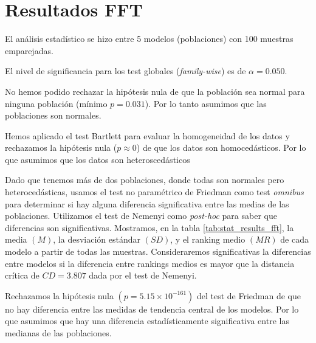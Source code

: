\documentclass[a4paper,oneside,11pt,leqno]{article}
\begin{document}
	\section{Resultados FFT}
	\label{sec:results_fft}

	El análisis estadístico se hizo entre 5 modelos (poblaciones) con 100 muestras emparejadas.

	El nivel de significancia para los test globales (\textit{family-wise}) es de $\alpha=0.050$.

	No hemos podido rechazar la hipótesis nula de que la población sea normal para ninguna población (mínimo $p=0.031$). Por lo tanto asumimos que las poblaciones son normales.

	Hemos aplicado el test Bartlett para evaluar la homogeneidad de los datos y rechazamos la hipótesis nula ($p\approx 0$) de que los datos son homocedásticos. Por lo que asumimos que los datos son heteroscedásticos

	Dado que tenemos más de dos poblaciones, donde todas son normales pero heterocedásticas, usamos el test no paramétrico de Friedman como test \textit{omnibus} para determinar si hay alguna diferencia significativa entre las medias de las poblaciones. Utilizamos el test de Nemenyi como \textit{post-hoc} para saber que diferencias son significativas. Mostramos, en la tabla \ref{tab:stat_results_fft}, la media $(M)$, la desviación estándar $(SD)$, y el ranking medio $(MR)$ de cada modelo a partir de todas las muestras. Consideraremos significativas la diferencias entre modelos si la diferencia entre rankings medios es mayor que la distancia crítica de $CD=3.807$ dada por el test de Nemenyi.

	Rechazamos la hipótesis nula $(p=5.15\times 10^{-161})$ del test de Friedman de que no hay diferencia entre las medidas de tendencia central de los modelos. Por lo que asumimos que hay una diferencia estadísticamente significativa entre las medianas de las poblaciones.
\end{document}
